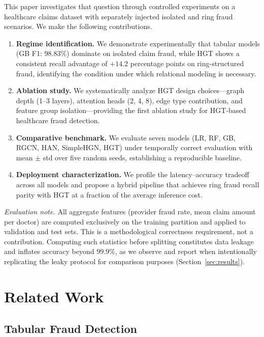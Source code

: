 \documentclass[pdflatex,sn-mathphys-num]{sn-jnl}
\theoremstyle{thmstyleone}
\theoremstyle{thmstyletwo}
\theoremstyle{thmstylethree}
\begin{document}
This paper investigates that question through controlled experiments on
a healthcare claims dataset with separately injected isolated and ring
fraud scenarios. We make the following contributions.

\begin{enumerate}
\item \textbf{Regime identification.} We demonstrate experimentally that
  tabular models (GB F1: $98.83\%$) dominate on isolated claim fraud,
  while HGT shows a consistent recall advantage of $+14.2$ percentage
  points on ring-structured fraud, identifying the condition under
  which relational modeling is necessary.
\item \textbf{Ablation study.} We systematically analyze HGT design
  choices---graph depth (1--3 layers), attention heads (2, 4, 8), edge
  type contribution, and feature group isolation---providing the first
  ablation study for HGT-based healthcare fraud detection.
\item \textbf{Comparative benchmark.} We evaluate seven models (LR,
  RF, GB, RGCN, HAN, SimpleHGN, HGT) under temporally correct
  evaluation with mean $\pm$ std over five random seeds, establishing a
  reproducible baseline.
\item \textbf{Deployment characterization.} We profile the
  latency--accuracy tradeoff across all models and propose a hybrid
  pipeline that achieves ring fraud recall parity with HGT at a
  fraction of the average inference cost.
\end{enumerate}

\noindent\textit{Evaluation note.} All aggregate features (provider
fraud rate, mean claim amount per doctor) are computed exclusively on
the training partition and applied to validation and test sets. This is
a methodological correctness requirement, not a contribution.
Computing such statistics before splitting constitutes data leakage and
inflates accuracy beyond $99.9\%$, as we observe and report when
intentionally replicating the leaky protocol for comparison purposes
(Section~\ref{sec:results}).

\section{Related Work}\label{sec:related}

\subsection{Tabular Fraud Detection}
\end{document}
